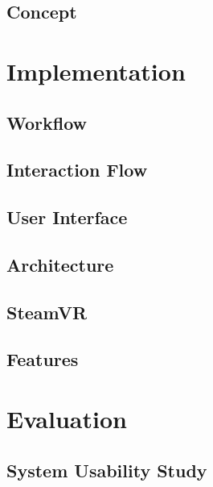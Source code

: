\documentclass[twoside, parskip]{VRThesis} %
\begin{document}
\section{\label{sec::Concept}Concept}


\chapter{\label{chap::Implementation}Implementation}

\section{\label{sec::Workflow}Workflow}

\section{\label{sec::InteractionFlow}Interaction Flow}

\section{\label{sec::UserInterface}User Interface}

\section{\label{sec::Architecture}Architecture}

\section{\label{sec::SteamVR}SteamVR}

\section{\label{sec::Features}Features}


\chapter{\label{chap::Evaluation}Evaluation}

\section{\label{sec::Methology}System Usability Study}

\end{document}
